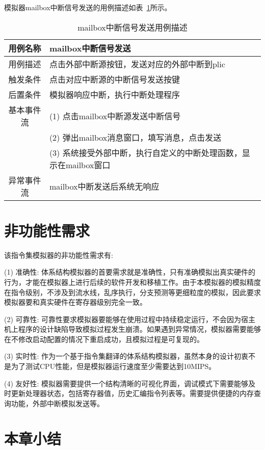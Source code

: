 模拟器mailbox中断信号发送的用例描述如表~\ref{tab:yongli5}所示。
\begin{table}[h]
  \centering
  \caption{mailbox中断信号发送用例描述}
  \label{tab:yongli5}
  \begin{tabular}{cl}
    \toprule
用例名称 & mailbox中断信号发送\\
    \midrule
用例描述	& 点击外部中断源按钮，发送对应的外部中断到plic\\
触发条件	& 点击对应中断源的中断信号发送按键\\
后置条件	& 模拟器响应中断，执行中断处理程序\\
基本事件流 &	(1)	点击mailbox中断源发送中断信号\\
  & (2)	弹出mailbox消息窗口，填写消息，点击发送\\
 & (3)	系统接受外部中断，执行自定义的中断处理函数，显示在mailbox窗口\\
异常事件流 &	mailbox中断发送后系统无响应\\
    \bottomrule
  \end{tabular}
\end{table}


\section{非功能性需求}

该指令集模拟器的非功能性需求有:


(1) 准确性: 体系结构模拟器的首要需求就是准确性，只有准确模拟出真实硬件的行为，才能在模拟器上进行后续的软件开发和移植工作。由于本模拟器的模拟精度在指令级别，不涉及到流水线，乱序执行，分支预测等更细粒度的模拟，因此要求模拟器要和真实硬件在寄存器级别完全一致。


(2) 可靠性: 可靠性要求模拟器要能够在使用过程中持续稳定运行，不会因为宿主机上程序的设计缺陷导致模拟过程发生崩溃。如果遇到异常情况，模拟器需要能够在不修改启动配置的情况下重启成功，且模拟过程是可复现的。


(3) 实时性: 作为一个基于指令集翻译的体系结构模拟器，虽然本身的设计初衷不是为了测试CPU性能，但是模拟器运行速度至少需要达到10MIPS。


(4) 友好性: 模拟器需要提供一个结构清晰的可视化界面，调试模式下需要能够及时更新处理器状态，包括寄存器值，历史汇编指令列表等。需要提供便捷的内存查询功能，外部中断模拟发送等。




\section{本章小结}

